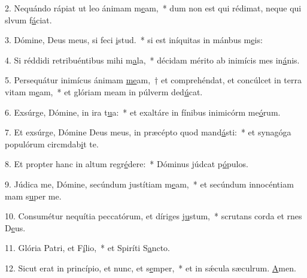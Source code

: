 2. Nequándo rápiat ut leo ánimam m\uline{e}am,~* dum non est qui rédimat, neque qui slvum f\uline{á}ciat.\par 
3. Dómine, Deus meus, si feci \uline{i}stud.~* si est iníquitas in mánbus m\uline{e}is:\par 
4. Si réddidi retribuéntibus mihi m\uline{a}la,~* décidam mérito ab inimícis mes in\uline{á}nis.\par 
5. Persequátur inimícus ánimam \uline{me}am,~† et comprehéndat, et concúlcet in terra vitam m\uline{e}am,~* et glóriam meam in púlverm ded\uline{ú}cat.\par 
6. Exsúrge, Dómine, in ira t\uline{u}a:~* et exaltáre in fínibus inimicórm me\uline{ó}rum.\par 
7. Et exsúrge, Dómine Deus meus, in præcépto quod mand\uline{á}sti:~* et synagóga populórum circmdab\uline{i}t te.\par 
8. Et propter hanc in altum regr\uline{é}dere:~* Dóminus júdcat p\uline{ó}pulos.\par 
9. Júdica me, Dómine, secúndum justítiam m\uline{e}am,~* et secúndum innocéntiam mam s\uline{u}per me.\par 
10. Consumétur nequítia peccatórum, et díriges j\uline{u}stum,~* scrutans corda et rnes D\uline{e}us.\par 
11. Glória Patri, et F\uline{í}lio,~* et Spiríti S\uline{a}ncto.\par 
12. Sicut erat in princípio, et nunc, et s\uline{e}mper,~* et in sǽcula sæculrum. \uline{A}men.\par 
